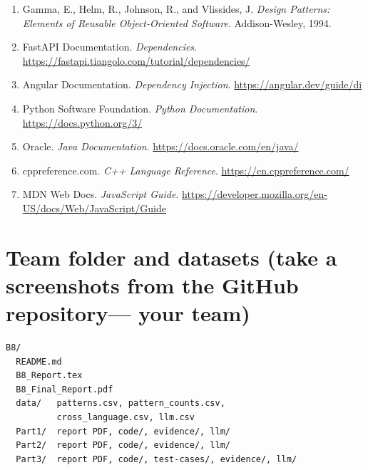 \documentclass[11pt,a4paper]{article}
\begin{document}
\begin{enumerate}
    \item Gamma, E., Helm, R., Johnson, R., and Vlissides, J.
    \textit{Design Patterns: Elements of Reusable
    Object-Oriented Software}. Addison-Wesley, 1994.

    \item FastAPI Documentation.
    \textit{Dependencies}.
    \url{https://fastapi.tiangolo.com/tutorial/dependencies/}

    \item Angular Documentation.
    \textit{Dependency Injection}.
    \url{https://angular.dev/guide/di}

    \item Python Software Foundation.
    \textit{Python Documentation}.
    \url{https://docs.python.org/3/}

    \item Oracle.
    \textit{Java Documentation}.
    \url{https://docs.oracle.com/en/java/}

    \item cppreference.com.
    \textit{C++ Language Reference}.
    \url{https://en.cppreference.com/}

    \item MDN Web Docs.
    \textit{JavaScript Guide}.
    \url{https://developer.mozilla.org/en-US/docs/Web/JavaScript/Guide}
\end{enumerate}

\section{Team folder and datasets (take a screenshots from the GitHub repository--- your team)}
\begin{verbatim}
B8/
  README.md
  B8_Report.tex
  B8_Final_Report.pdf
  data/   patterns.csv, pattern_counts.csv,
          cross_language.csv, llm.csv
  Part1/  report PDF, code/, evidence/, llm/
  Part2/  report PDF, code/, evidence/, llm/
  Part3/  report PDF, code/, test-cases/, evidence/, llm/
\end{verbatim}
\end{document}
